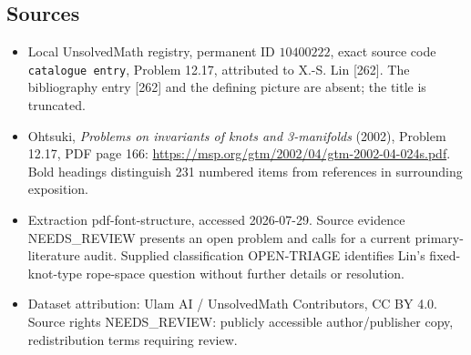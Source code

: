 \documentclass[11pt]{article}
\begin{document}
\subsection{Sources}
\begin{itemize}
\item Local UnsolvedMath registry, permanent ID \(10400222\), exact source code \texttt{catalogue entry}, Problem 12.17, attributed to X.-S. Lin [262]. The bibliography entry [262] and the defining picture are absent; the title is truncated.
\item Ohtsuki, \emph{Problems on invariants of knots and 3-manifolds} (2002), Problem 12.17, PDF page 166: \url{https://msp.org/gtm/2002/04/gtm-2002-04-024s.pdf}. Bold headings distinguish 231 numbered items from references in surrounding exposition.
\item Extraction pdf-font-structure, accessed 2026-07-29. Source evidence NEEDS\_REVIEW presents an open problem and calls for a current primary-literature audit. Supplied classification OPEN-TRIAGE identifies Lin's fixed-knot-type rope-space question without further details or resolution.
\item Dataset attribution: Ulam AI / UnsolvedMath Contributors, CC BY 4.0. Source rights NEEDS\_REVIEW: publicly accessible author/publisher copy, redistribution terms requiring review.
\end{itemize}
\end{document}
